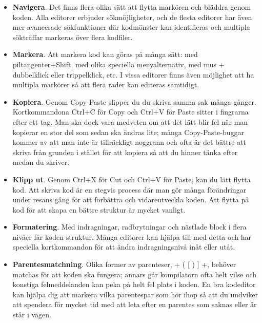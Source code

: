 \begin{itemize}
\item \textbf{Navigera}. Det finns flera olika sätt att flytta markören och bläddra genom koden. Alla editorer erbjuder sökmöjligheter, och de flesta editorer har även mer avancerade sökfunktioner där kodmönster kan identifieras och multipla sökträffar markeras över flera kodfiler. 

\item \textbf{Markera}. Att markera kod kan göras på många sätt: med piltangenter+Shift, med olika speciella menyalternativ, med mus + dubbelklick eller trippelklick, etc. I vissa editorer finns även möjlighet att ha multipla markörer så att flera rader kan editeras samtidigt.

\item \textbf{Kopiera}. Genom Copy-Paste slipper du du skriva samma sak många gånger. Kortkommandona Ctrl+C för Copy och Ctrl+V för Paste sitter i fingrarna efter ett tag. Man ska dock vara medveten om att det lätt blir fel när man kopierar en stor del som sedan ska ändras lite; många Copy-Paste-buggar kommer av att man inte är tillräckligt noggrann och ofta är det bättre att skriva från grunden i stället för att kopiera så att du hinner tänka efter medan du skriver.

\item \textbf{Klipp ut}. Genom Ctrl+X för Cut och Ctrl+V för Paste, kan du lätt flytta kod. Att skriva kod är en stegvis process där man gör många förändringar under resans gång för att förbättra och vidareutveckla koden. Att flytta på kod för att skapa en bättre struktur är mycket vanligt.

\item \textbf{Formatering}. Med indragningar, radbrytningar och nästlade block i flera nivåer får koden struktur. Många editorer kan hjälpa till med detta och har speciella kortkommandon för att ändra indragningsnivå inåt eller utåt. 

\item \textbf{Parentesmatchning}. Olika former av parenteser, \code+ ( { [ ) } ] +,  behöver matchas för att koden ska fungera; annars går kompilatorn ofta helt vilse och konstiga felmeddelanden kan peka på helt fel plats i koden. En bra kodeditor kan hjälpa dig att markera vilka parentespar som hör ihop så att du undviker att spendera för mycket tid med att leta efter en parentes som saknas eller är står i vägen.
    
\end{itemize}


